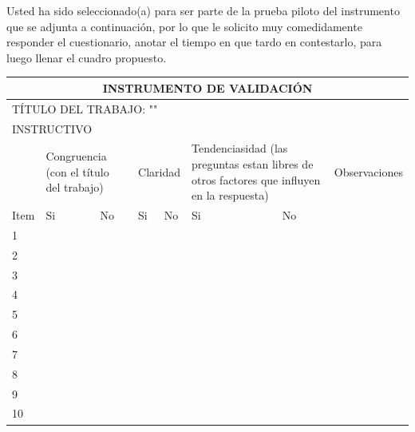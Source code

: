 \documentclass[12pt, a4paper, nofontenc, numbers=endperiod]{apa7}
\begin{document}
{{	\setlength{\parindent}{0cm} Usted ha sido seleccionado(a)  para ser parte de la prueba piloto del instrumento que se adjunta a continuación, por lo que le solicito muy comedidamente responder el cuestionario, anotar el tiempo en que tardo en contestarlo, para luego llenar el cuadro propuesto.
	
	\begin{table}[h]
		{\renewcommand{\arraystretch}{1}	
			{\singlespacing
				\begin{tabular}{|p{1cm}|p{1.25cm}|c|p{1.25cm}|c|p{1.75cm}|c|c|}
					\hline
					\multicolumn{8}{|c|}{INSTRUMENTO DE VALIDACIÓN}  \\
					\hline
					\multicolumn{8}{|l|}{TÍTULO DEL TRABAJO: ""}  \\
					\hline
					\multicolumn{8}{|l|}{INSTRUCTIVO}  \\
					\hline
					& \multicolumn{2}{p{3cm}|}{\centering Congruencia  (con el título del trabajo)}  &\multicolumn{2}{p{3cm}|}{\centering  Claridad}&\multicolumn{2}{p{4cm}|}{Tendenciasidad (las preguntas estan libres de otros factores que influyen en la respuesta)}& \multicolumn{1}{p{2.71cm}|}{Observaciones} \\
					\hhline{|-|-|-|-|-|-|-|}
					\footnotesize Item &   \footnotesize Si & \footnotesize \hspace*{-0.9cm}No & \footnotesize Si & \footnotesize  \hspace*{-0.9cm} No &\footnotesize Si&\footnotesize \hspace*{-0.9cm} No&\\
					\hline
					\footnotesize 1 &   \footnotesize  &&&&&& \\
					\hline
					\footnotesize 2 &  \footnotesize  &&&&&& \\
					\hline
					\footnotesize 3 &   \footnotesize  &&&&&&\\
					\hline
					\footnotesize 4 &   \footnotesize  &&&&&&\\
					\hline
					\footnotesize 5 &   \footnotesize  &&&&&&\\
					\hline
					\footnotesize 6 &   \footnotesize  &&&&&&\\
					\hline
					\footnotesize 7 &   \footnotesize  &&&&&&\\
					\hline
					\footnotesize 8 &   \footnotesize  &&&&&&\\
					\hline
					\footnotesize 9 &   \footnotesize  &&&&&&\\
					\hline
					\footnotesize 10 &   \footnotesize  &&&&&&\\

\end{tabular}}}
\end{table}}}
\end{document}
